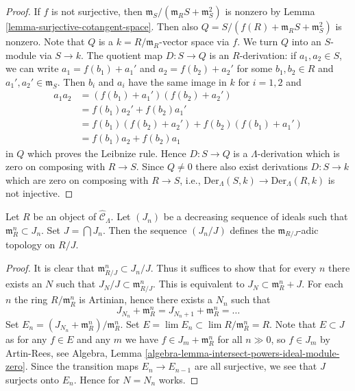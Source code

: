 \begin{proof}
If $f$ is not surjective, then
$\mathfrak m_S/(\mathfrak m_R S + \mathfrak m_S^2)$ is nonzero by
Lemma \ref{lemma-surjective-cotangent-space}.
Then also $Q = S/(f(R) + \mathfrak m_R S + \mathfrak m_S^2)$ is nonzero.
Note that $Q$ is a $k = R/\mathfrak m_R$-vector space via $f$. We turn
$Q$ into an $S$-module via $S \to k$. The quotient
map $D : S \to Q$ is an $R$-derivation: if $a_1, a_2 \in S$, we can write
$a_1 = f(b_1) + a_1'$ and $a_2 = f(b_2) + a_2'$ for some
$b_1, b_2 \in R$ and $a_1', a_2' \in \mathfrak m_S$. Then
$b_i$ and $a_i$ have the same image in $k$ for $i = 1, 2$ and
\begin{align*}
a_1a_2 & = (f(b_1) + a_1')(f(b_2) + a_2') \\
& = f(b_1)a_2' + f(b_2)a_1' \\
& = f(b_1)(f(b_2) + a_2') + f(b_2)(f(b_1) + a_1') \\
& = f(b_1)a_2 + f(b_2)a_1
\end{align*}
in $Q$ which proves the Leibnize rule. Hence $D : S \to Q$ is a
$\Lambda$-derivation which is zero on composing with $R \to S$.
Since $Q \not = 0$ there also exist derivations $D : S \to k$ which
are zero on composing with $R \to S$, i.e.,
$\text{Der}_\Lambda(S, k) \to \text{Der}_\Lambda(R, k)$ is not injective.
\end{proof}

\begin{lemma}
\label{lemma-m-adic-topology}
Let $R$ be an object of $\widehat{\mathcal{C}}_\Lambda$. Let $(J_n)$ be a
decreasing sequence of ideals such that $\mathfrak m_R^n \subset J_n$.
Set $J = \bigcap J_n$. Then the sequence $(J_n/J)$ defines the
$\mathfrak m_{R/J}$-adic topology on $R/J$.
\end{lemma}

\begin{proof}
It is clear that $\mathfrak m_{R/J}^n \subset J_n/J$. Thus it suffices
to show that for every $n$ there exists an $N$ such that
$J_N/J \subset \mathfrak m_{R/J}^n$. This is equivalent to
$J_N \subset \mathfrak m_R^n + J$. For each $n$ the ring $R/\mathfrak m_R^n$
is Artinian, hence there exists a $N_n$ such that
$$
J_{N_n} + \mathfrak m_R^n = J_{N_n + 1} + \mathfrak m_R^n = \ldots
$$
Set $E_n = (J_{N_n} + \mathfrak m_R^n)/\mathfrak m_R^n$.
Set $E = \lim E_n \subset \lim R/\mathfrak m_R^n = R$.
Note that $E \subset J$ as for any $f \in E$ and any $m$
we have $f \in J_m + \mathfrak m_R^n$ for all $n \gg 0$, so
$f \in J_m$ by Artin-Rees, see
Algebra, Lemma \ref{algebra-lemma-intersect-powers-ideal-module-zero}.
Since the transition maps $E_n \to E_{n - 1}$ are all surjective,
we see that $J$ surjects onto $E_n$. Hence for $N = N_n$ works.
\end{proof}


